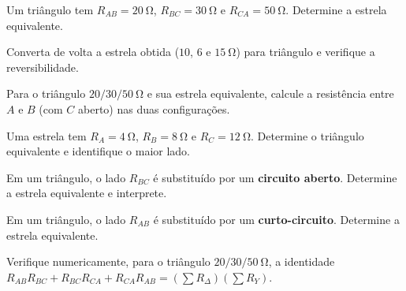 \blocoaplicacao
\begin{questao}[2]{}

Um triângulo tem $R_{AB}=\SI{20}{\ohm}$, $R_{BC}=\SI{30}{\ohm}$ e
$R_{CA}=\SI{50}{\ohm}$. Determine a estrela equivalente.


\end{questao}
\begin{questao}[2]{}

Converta de volta a estrela obtida ($10$, $6$ e $\SI{15}{\ohm}$) para
triângulo e verifique a reversibilidade.


\end{questao}
\begin{questao}[2]{}

Para o triângulo $20/30/\SI{50}{\ohm}$ e sua estrela equivalente, calcule a
resistência entre $A$ e $B$ (com $C$ aberto) nas duas configurações.


\end{questao}
\begin{questao}[2]{}

Uma estrela tem $R_A=\SI{4}{\ohm}$, $R_B=\SI{8}{\ohm}$ e
$R_C=\SI{12}{\ohm}$. Determine o triângulo equivalente e identifique o maior
lado.


\end{questao}
\begin{questao}[2]{}

Em um triângulo, o lado $R_{BC}$ é substituído por um \textbf{circuito aberto}.
Determine a estrela equivalente e interprete.


\end{questao}
\begin{questao}[2]{}

Em um triângulo, o lado $R_{AB}$ é substituído por um \textbf{curto-circuito}.
Determine a estrela equivalente.


\end{questao}
\begin{questao}[2]{}

Verifique numericamente, para o triângulo $20/30/\SI{50}{\ohm}$, a identidade
$R_{AB}R_{BC}+R_{BC}R_{CA}+R_{CA}R_{AB}
=\left(\sum R_\Delta\right)\left(\sum R_Y\right)$.


\end{questao}
